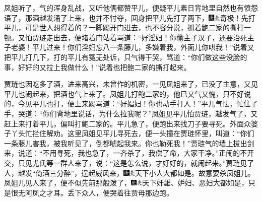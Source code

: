 凤姐听了，气的浑身乱战，又听他俩都赞平儿，便疑平儿素日背地里自然也有愤怨语了，那酒越发涌了上来，也并不忖夺，回身把平儿先打了两下，{\includegraphics[width=3mm]{../Images/00004}\includegraphics[width=3mm]{../Images/00012}\footnotesize \kaishu 奇极！先打平儿，可是世人想得着的？}一脚踢开门进去，也不容分说，抓着鲍二家的撕打一顿。又怕贾琏走出去，便堵着门站着骂道：“好淫妇！你偷主子汉子，还要治死主子老婆！平儿过来！你们淫妇忘八一条藤儿，多嫌着我，外面儿你哄我！”说着又把平儿打几下，打的平儿有冤无处诉，只气得干哭，骂道：“你们做这些没脸的事，好好的又拉上我做什么！”说着也把鲍二家的撕打起来。

贾琏也因吃多了酒，进来高兴，未曾作的机密，一见凤姐来了，已没了主意，又见平儿也闹起来，把酒也气上来了。凤姐儿打鲍二家的，他已又气又愧，只不好说的，今见平儿也打，便上来踢骂道：“好娼妇！你也动手打人！”平儿气怯，忙住了手，哭道：“你们背地里说话，为什么拉我呢？”凤姐见平儿怕贾琏，越发气了，又赶上来打着平儿，偏叫打鲍二家的。平儿急了，便跑出来找刀子要寻死。外面众婆子丫头忙拦住解劝。这里凤姐见平儿寻死去，便一头撞在贾琏怀里，叫道：“你们一条藤儿害我，被我听见了，倒都唬起我来。你也勒死我！”贾琏气的墙上拔出剑来，说道：“不用寻死，我也急了，一齐杀了，我偿了命，大家干净。”正闹的不开交，只见尤氏等一群人来了，说：“这是怎么说，才好好的，就闹起来。”贾琏见了人，越发“倚酒三分醉”，逞起威风来，{\includegraphics[width=3mm]{../Images/00004}\includegraphics[width=3mm]{../Images/00012}\footnotesize \kaishu 天下小人大都如是。}故意要杀凤姐儿。凤姐儿见人来了，便不似先前那般泼了，{\includegraphics[width=3mm]{../Images/00004}\includegraphics[width=3mm]{../Images/00012}\footnotesize \kaishu 天下奸雄、妒妇、恶妇大都如是，只是恨无阿凤之才耳。}丢下众人，便哭着往贾母那边跑。

